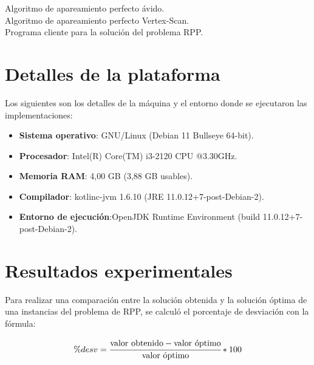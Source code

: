 \documentclass[11pt]{article}
\begin{document}
Algoritmo de apareamiento perfecto ávido.\\

Algoritmo de apareamiento perfecto Vertex-Scan.\\

Programa cliente para la solución del problema RPP.\\


\section{Detalles de la plataforma}
Los siguientes son los detalles de la máquina y el entorno donde se ejecutaron las implementaciones:

\begin{itemize}
   \item \textbf{Sistema operativo}: GNU/Linux (Debian 11 Bullseye 64-bit).
   \item \textbf{Procesador}: Intel(R) Core(TM) i3-2120 CPU @3.30GHz.
   \item \textbf{Memoria RAM}: 4,00 GB (3,88 GB usables).
   \item \textbf{Compilador}: kotlinc-jvm 1.6.10 (JRE 11.0.12+7-post-Debian-2).
   \item \textbf{Entorno de ejecución}:OpenJDK Runtime Environment (build 11.0.12+7-post-Debian-2).
\end{itemize}

\section{Resultados experimentales}

Para realizar una comparación entre la solución obtenida y la solución óptima de una instancias
del problema de RPP, se calculó el porcentaje de desviación con la fórmula:

\begin{equation}
    \%desv = \cfrac{\text{valor obtenido} - \text{valor óptimo}}{\text{valor óptimo}} *100
\end{equation}
\end{document}
